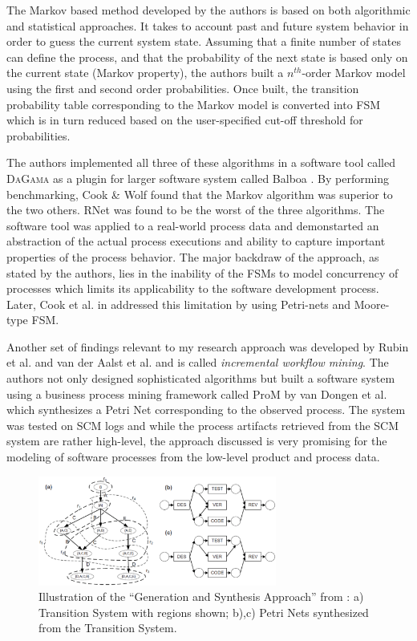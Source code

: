 \documentclass{sig-alternate}
\begin{document}
The Markov based method developed by the authors is based on both algorithmic and statistical approaches. It takes to account past and future system behavior in order to guess the current system state. Assuming that a finite number of states can define the process, and that the probability of the next state is based only on the current state (Markov property), the authors built a $n^{th}$-order Markov model using the first and second order probabilities. Once built, the transition probability table corresponding to the Markov model is converted into FSM which is in turn reduced based on the user-specified cut-off threshold for probabilities.

The authors implemented all three of these algorithms in a software tool called \textsc{DaGama} as a plugin for larger software system called Balboa \cite{citeulike:5120757}. By performing benchmarking, Cook \& Wolf found that the Markov algorithm was superior to the two others. RNet was found to be the worst of the three algorithms. The software tool was applied to a real-world process data and demonstarted an abstraction of the actual process executions and ability to capture important properties of the process behavior. The major backdraw of the approach, as stated by the authors, lies in the inability of the FSMs to model concurrency of processes which limits its applicability to the software development process. Later, Cook et al. in \cite{citeulike:5128143} addressed this limitation by using Petri-nets and Moore-type FSM.

Another set of findings relevant to my research approach was developed by Rubin et al. \cite{citeulike:1885717} and van der Aalst et al. \cite{citeulike:3718014} and is called \textit{incremental workflow mining}. The authors not only designed sophisticated algorithms but built a software system using a business process mining framework called ProM by van Dongen et al. \cite{citeulike:5043673} which synthesizes a Petri Net corresponding to the observed process. The system was tested on SCM logs and while the process artifacts retrieved from the SCM system are rather high-level, the approach discussed is very promising for the modeling of software processes from the low-level product and process data.

\begin{figure}[tbp]
   \centering
   \includegraphics[height=36mm]{petri.eps}
   \caption{Illustration of the ``Generation and Synthesis Approach'' from \cite{citeulike:5043673}: a) Transition System with regions shown; b),c) Petri Nets synthesized from the Transition System.}
   \label{fig:petri}
\end{figure}
\end{document}
